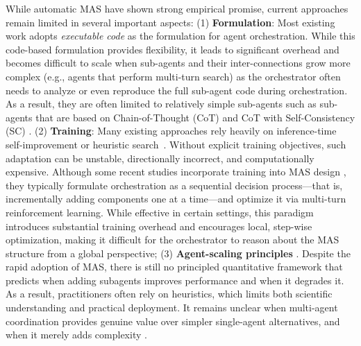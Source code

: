 While automatic MAS have shown strong empirical promise, current approaches remain limited in several important aspects: (1) \textbf{Formulation}: Most existing work \citep{Ke2025MASZero,nie2025weakforstrong,hu2024ADAS} adopts \textit{executable code} as the formulation for agent orchestration. While this  {code-based} formulation provides flexibility, it leads to significant overhead and becomes difficult to scale when sub-agents and their inter-connections grow more complex (e.g., agents that perform multi-turn search) as the orchestrator often needs  to analyze or even reproduce the full sub-agent code during orchestration. %
 As a result, they are often limited to relatively simple sub-agents such as sub-agents that are based on Chain-of-Thought (CoT) \citep{wei2022chain} and CoT with Self-Consistency (SC) \citep{wang2023selfconsistency}. (2) \textbf{Training}: Many  existing  approaches rely heavily on inference-time self-improvement or heuristic search~\citep{zhang2024aflowautomatingagenticworkflow,liu2024dynamicllmpowered}. Without explicit training objectives, such adaptation can be unstable, directionally incorrect, and computationally expensive. Although some recent studies incorporate training into MAS design \citep{dang2025multiagentcollaborationevolvingorchestration,chi2025eraagenticorganizationlearning}, they typically formulate orchestration as a sequential decision process—that is, incrementally adding components one at a time—and optimize it via multi-turn reinforcement learning. While effective in certain settings, this paradigm introduces substantial training overhead and encourages local, step-wise optimization, making it difficult for the orchestrator to reason about the MAS structure from a global perspective; 
(3) \textbf{Agent-scaling principles} \citep{li2024more,qian2025scaling}. Despite the rapid adoption of MAS, there is still no principled quantitative framework that predicts when adding subagents improves performance and when it degrades it. As a result, practitioners often rely on heuristics, which limits both scientific understanding and practical deployment. It remains unclear when multi-agent coordination provides genuine value over simpler single-agent alternatives, and when it merely adds complexity {\citep{kim2025sciencescalingagentsystems,huang2024large}.} 



